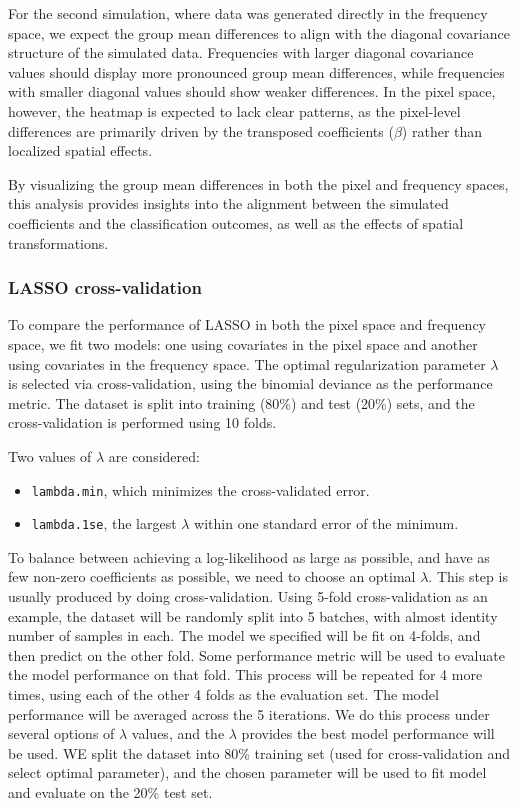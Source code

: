\documentclass[12pt]{article}
\begin{document}
For the second simulation, where data was generated directly in the frequency space, we expect the group mean differences to align with the diagonal covariance structure of the simulated data. Frequencies with larger diagonal covariance values should display more pronounced group mean differences, while frequencies with smaller diagonal values should show weaker differences. In the pixel space, however, the heatmap is expected to lack clear patterns, as the pixel-level differences are primarily driven by the transposed coefficients (\( \beta \)) rather than localized spatial effects.

By visualizing the group mean differences in both the pixel and frequency spaces, this analysis provides insights into the alignment between the simulated coefficients and the classification outcomes, as well as the effects of spatial transformations.


\subsubsection{LASSO cross-validation}

To compare the performance of LASSO in both the pixel space and frequency space, we fit two models: one using covariates in the pixel space and another using covariates in the frequency space. The optimal regularization parameter \( \lambda \) is selected via cross-validation, using the binomial deviance as the performance metric. The dataset is split into training (80\%) and test (20\%) sets, and the cross-validation is performed using 10 folds.

Two values of \( \lambda \) are considered: 
\begin{itemize}
  \item \texttt{lambda.min}, which minimizes the cross-validated error.
  \item \texttt{lambda.1se}, the largest \( \lambda \) within one standard error of the minimum.
\end{itemize}

To balance between achieving a log-likelihood as large as possible, and have as few non-zero coefficients as possible, we need to choose an optimal \( \lambda \). This step is usually produced by doing cross-validation. Using 5-fold cross-validation as an example, the dataset will be randomly split into 5 batches, with almost identity number of samples in each. The model we specified will be fit on 4-folds, and then predict on the other fold. Some performance metric will be used to evaluate the model performance on that fold. This process will be repeated for 4 more times, using each of the other 4 folds as the evaluation set. The model performance will be averaged across the 5 iterations. We do this process under several options of \( \lambda \) values, and the \( \lambda \) provides the best model performance will be used. WE split the dataset into 80\% training set (used for cross-validation and select optimal parameter), and the chosen parameter will be used to fit model and evaluate on the 20\% test set.
\end{document}
